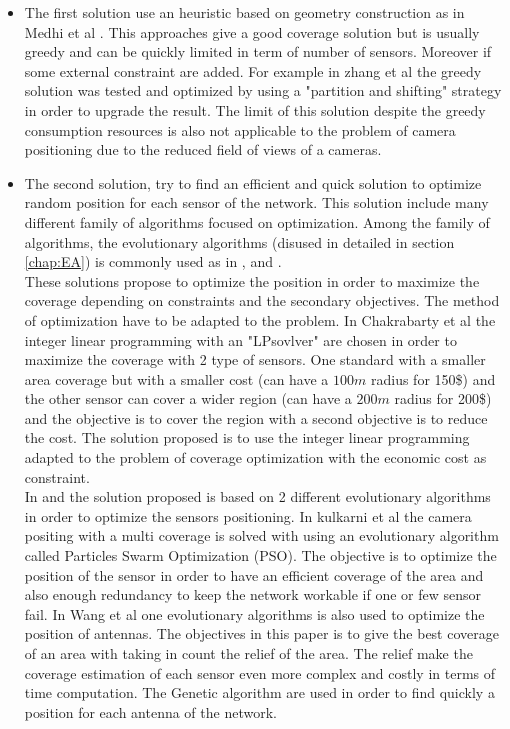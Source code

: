 \begin{itemize}


\item	The first solution use an heuristic based on geometry construction as in  Medhi et al \cite{175*medhi2013}. This approaches give a good coverage solution but is usually greedy and can be quickly limited in term of number of sensors. Moreover if some external constraint are added.  For example in zhang et al \cite{174*zhang2016} the greedy solution was tested and optimized by using a "partition and shifting" strategy in order to upgrade the result.
The limit of this solution despite the greedy consumption resources is also not applicable to the problem of camera positioning due to the reduced field of views of a cameras.  \\
\item	The second solution, try to find an efficient and quick solution to optimize  random position for each sensor of the network.  
This solution include many different family of algorithms focused on optimization.
Among the family of algorithms, the evolutionary algorithms (disused in detailed in section \ref{chap:EA}) is commonly used as in \cite{200*kulkarni2011,59*wang2008}, and \cite{150*chakrabarty2002}. \\
These solutions propose to optimize the position in order to maximize the coverage depending on constraints and the secondary objectives. The method of optimization have to be adapted to the problem. 
In Chakrabarty et al \cite{150*chakrabarty2002} the integer linear programming with an "LPsovlver" are chosen in order to maximize the coverage with 2 type of sensors. One standard with a smaller area coverage but with a smaller cost (can have a $100m$ radius for 150\$) and the other sensor can cover a wider region (can have a $200m$  radius for 200\$) and the objective is to cover the region with a second objective is to reduce the cost. The solution proposed is to use the integer linear programming adapted to the problem of coverage optimization with the economic cost as constraint. \\
In \cite{59*wang2008} and \cite{200*kulkarni2011} the solution proposed is based on 2 different evolutionary algorithms in order to optimize the sensors positioning. 
In kulkarni et al \cite{200*kulkarni2011} the camera positing with a multi coverage is solved with using an evolutionary algorithm called Particles Swarm Optimization (PSO). The objective is to optimize the position of the sensor in order to have an efficient coverage of the area and also enough redundancy to keep the network workable if one or few sensor fail. In Wang et al \cite{59*wang2008} one evolutionary algorithms is also used to optimize the position of antennas. The objectives in this paper is to give the best coverage of an area with taking in count the relief of the area. The relief make the coverage estimation of each sensor even more complex and costly in terms of time computation. The Genetic algorithm are used in order to find quickly a position for each antenna of the network. 
\end{itemize}

